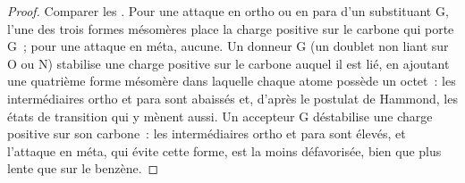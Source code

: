 \begin{proof}
Comparer les . Pour une attaque en ortho ou en para d'un substituant G,
l'une des trois formes mésomères place la charge positive sur le carbone qui porte G~; pour une
attaque en méta, aucune. Un donneur G (un doublet non liant sur O ou N) stabilise une charge
positive sur le carbone auquel il est lié, en ajoutant une quatrième forme mésomère dans laquelle
chaque atome possède un octet~: les intermédiaires ortho et para sont abaissés et, d'après le
postulat de Hammond, les états de transition qui y mènent aussi. Un accepteur G déstabilise une
charge positive sur son carbone~: les intermédiaires ortho et para sont élevés, et l'attaque en
méta, qui évite cette forme, est la moins défavorisée, bien que plus lente que sur le benzène.
\end{proof}

